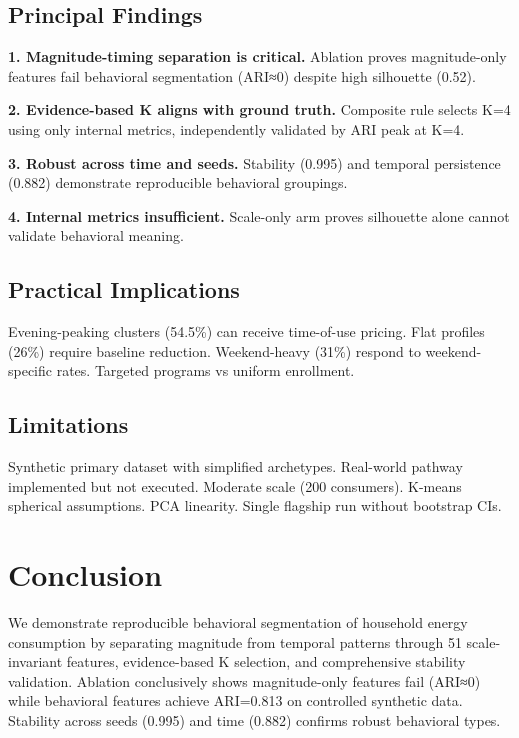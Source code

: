 \documentclass[11pt,a4paper]{article}
\begin{document}
\subsection{Principal Findings}

\textbf{1. Magnitude-timing separation is critical.} Ablation proves magnitude-only features fail behavioral segmentation (ARI≈0) despite high silhouette (0.52).

\textbf{2. Evidence-based K aligns with ground truth.} Composite rule selects K=4 using only internal metrics, independently validated by ARI peak at K=4.

\textbf{3. Robust across time and seeds.} Stability (0.995) and temporal persistence (0.882) demonstrate reproducible behavioral groupings.

\textbf{4. Internal metrics insufficient.} Scale-only arm proves silhouette alone cannot validate behavioral meaning.

\subsection{Practical Implications}

Evening-peaking clusters (54.5\%) can receive time-of-use pricing. Flat profiles (26\%) require baseline reduction. Weekend-heavy (31\%) respond to weekend-specific rates. Targeted programs vs uniform enrollment.

\subsection{Limitations}

Synthetic primary dataset with simplified archetypes. Real-world pathway implemented but not executed. Moderate scale (200 consumers). K-means spherical assumptions. PCA linearity. Single flagship run without bootstrap CIs.

\section{Conclusion}

We demonstrate reproducible behavioral segmentation of household energy consumption by separating magnitude from temporal patterns through 51 scale-invariant features, evidence-based K selection, and comprehensive stability validation. Ablation conclusively shows magnitude-only features fail (ARI≈0) while behavioral features achieve ARI=0.813 on controlled synthetic data. Stability across seeds (0.995) and time (0.882) confirms robust behavioral types.
\end{document}
